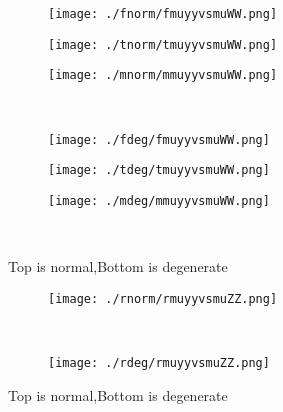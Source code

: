 \documentclass[aps,floats,floatfix,nofootinbib]{revtex4-1}
\begin{document}
\begin{center}
\begin{figure}
\begin{subfigure}{0.3\textwidth}
\texttt{[image: ./fnorm/fmuyyvsmuWW.png]}
\label{}
\end{subfigure}
\begin{subfigure}{0.3\textwidth}
\texttt{[image: ./tnorm/tmuyyvsmuWW.png]}
\label{}
\end{subfigure}
\begin{subfigure}{0.3\textwidth}
\texttt{[image: ./mnorm/mmuyyvsmuWW.png]}
\label{}
\end{subfigure}\\
\begin{subfigure}{0.3\textwidth}
\texttt{[image: ./fdeg/fmuyyvsmuWW.png]}
\label{}
\end{subfigure}
\begin{subfigure}{0.3\textwidth}
\texttt{[image: ./tdeg/tmuyyvsmuWW.png]}
\label{}
\end{subfigure}
\begin{subfigure}{0.3\textwidth}
\texttt{[image: ./mdeg/mmuyyvsmuWW.png]}
\label{}
\end{subfigure}\\
\caption{Top is normal,Bottom is degenerate}
\end{figure}
\end{center}

\begin{center}
\begin{figure}
\begin{subfigure}{1.0\textwidth}
\texttt{[image: ./rnorm/rmuyyvsmuZZ.png]}
\label{}
\end{subfigure}\\
\begin{subfigure}{1.0\textwidth}
\texttt{[image: ./rdeg/rmuyyvsmuZZ.png]}
\label{}
\end{subfigure}
\caption{Top is normal,Bottom is degenerate}
\end{figure}
\end{center}
\end{document}
